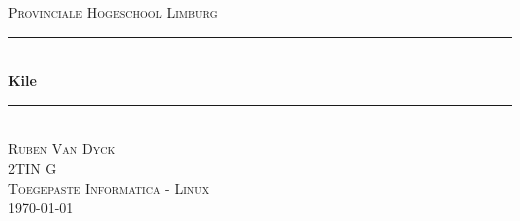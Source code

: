 \documentclass[12pt]{article} %
\begin{document}

\begin{titlepage}

\newcommand{\HRule}{\rule{\linewidth}{0.5mm}} %

\center %

\textsc{\LARGE Provinciale Hogeschool Limburg}\\[4cm] %


\HRule \\[0.4cm]
{ \huge \bfseries Kile}\\[0.4cm] %
\HRule \\[2cm]


\textsc{\Large Ruben Van Dyck}\\[0.5cm] %
\textsc{\small 2TIN G}\\[0.2cm]
\textsc{\large Toegepaste Informatica - Linux}\\[0.5cm] %


{\large \today}\\[3cm] %


\vfill %

\end{titlepage}


\tableofcontents %

\newpage %


\fancyhf{}
\fancyfoot[R]{\thepage}
\end{document}
